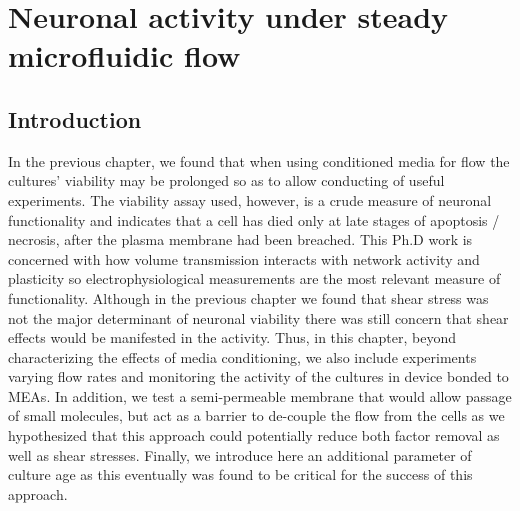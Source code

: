 \chapter{Neuronal activity under steady microfluidic flow}
\label{chap:activityAndFlow}

\section{Introduction}
In the previous chapter, we found that when using conditioned media for flow the cultures' viability may be prolonged so as to allow conducting of useful experiments. The viability assay used, however, is a crude measure of neuronal functionality and indicates that a cell has died only at late stages of apoptosis / necrosis, after the plasma membrane had been breached. This Ph.D work is concerned with how volume transmission interacts with network activity and plasticity so electrophysiological measurements are the most relevant measure of functionality. Although in the previous chapter we found that shear stress was not the major determinant of neuronal viability there was still concern that shear effects would be manifested in the activity. Thus, in this chapter, beyond characterizing the effects of media conditioning, we also include experiments varying flow rates and monitoring the activity of the cultures in device bonded to MEAs. In addition, we test a semi-permeable membrane that would allow passage of small molecules, but act as a barrier to de-couple the flow from the cells as we hypothesized that this approach could potentially reduce both factor removal as well as shear stresses. Finally, we introduce here an additional parameter of culture age as this eventually was found to be critical for the success of this approach.

\label{sec:crossFlow:intro}

